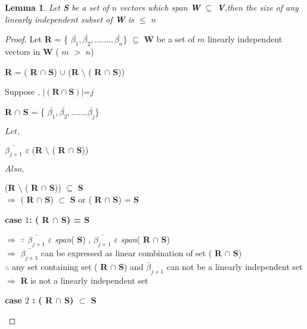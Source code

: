 \documentclass[11pt]{article}
\theoremstyle{definition}
\theoremstyle{plain}
\newtheorem{lemma}{Lemma}
\begin{document}
 \begin{lemma}


Let \textbf{S} be a set of \( n \) vectors which span \textbf{W} $\subseteq$ \textbf{V},then the size of any linearly independent subset of \textbf{W} is
$\leq$ \( n\)
\end{lemma}
\begin{proof}
Let
   \textbf{R} = \{ $\bar{\beta_1},\bar{\beta_2},.......,\bar{\beta_n}$\} $\subseteq$ \textbf{W}
   be a set of \( m\) linearly independent vectors in \textbf{W} ( \( m\) $>$ \( n\)) 
   \begin{center}
       \textbf{R} = ( \textbf{R} $\cap$ \textbf{S}) $\cup$ 
       (\textbf{R} $\setminus$ ( \textbf{R} $\cap$ \textbf{S}))
\end{center}
       Suppose ,   $|( \textbf{R} \cap \textbf{S} )|$=\( j\)
   \\    
   \begin{center}
       
   \textbf{R} $\cap$ \textbf{S} = \{ $\bar{\beta_1},\bar{\beta_2},.......\bar{\beta_j}$\}
    \end{center}
 $Let,$
 \begin{center}
  $\bar{\beta_{j+1}}$ $\varepsilon$  (\textbf{R} $\setminus$ ( \textbf{R}
 $\cap$ \textbf{S}))
 \\
 \end{center}
 $Also,$
 \begin{center}
     
 
  (\textbf{R} $\setminus$ ( \textbf{R}          $\cap$ \textbf{S})) $\subseteq$ \textbf{S} 
 \\
 $\Longrightarrow$  ( \textbf{R}          $\cap$ \textbf{S})  $\subset$ \textbf{S}  or  ( \textbf{R}          $\cap$ \textbf{S})  = \textbf{S}
 
 
\end{center}
 \textbf{case \( 1\): ( \textbf{R}          $\cap$ \textbf{S})  = \textbf{S}}
 
 \begin{center}
     
  $\Longrightarrow$ $\because$ $\bar{\beta_{j+1}}$ $\varepsilon$ \textit{span}( \textbf{S})   ,   $\bar{\beta_{j+1}}$ $\varepsilon$ \textit{span}( \textbf{R}
 $\cap$ \textbf{S})
 \newline
 \\$\Longrightarrow$ $\bar{\beta_{j+1}}$ can be expressed as linear combination of set  ( \textbf{R}
 $\cap$ \textbf{S})
 \\
 $\therefore$ any set containing set ( \textbf{R}
 $\cap$ \textbf{S}) and $\bar\beta_{j+1}$ can not be a linearly independent set
 \newline
 \\$\Longrightarrow$ \textbf{R} is not a linearly independent set
\end{center}
\textbf{case \( 2\) : ( \textbf{R}          $\cap$ \textbf{S})  $\subset$ \textbf{S}}
\begin{center}
    


\end{center}
\end{proof}
\end{document}
